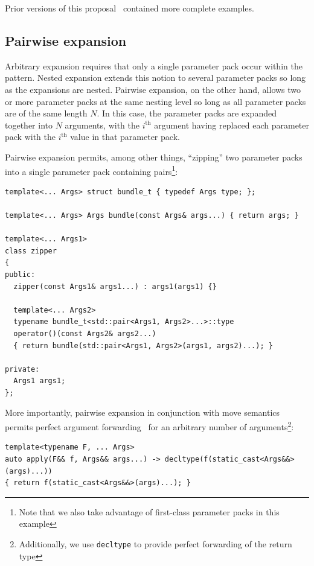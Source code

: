 \documentclass{article}
\begin{document}
Prior versions of this proposal~\cite{GJP04a} contained more complete
examples.

\subsection{Pairwise expansion}
Arbitrary expansion requires that only a single parameter pack occur
within the pattern. Nested expansion extends this notion to several
parameter packs so long as the expansions are nested. Pairwise
expansion, on the other hand, allows two or more parameter packs at
the same nesting level so long as all parameter packs are of the same
length $N$. In this case, the parameter packs are expanded together
into $N$ arguments, with the $i^{\text{th}}$ argument having replaced
each parameter pack with the $i^{\text{th}}$ value in that parameter
pack.

Pairwise expansion permits, among other things, ``zipping'' two
parameter packs into a single parameter pack containing
pairs\footnote{Note that we also take advantage of first-class
  parameter packs in this example}:

\begin{verbatim}
template<... Args> struct bundle_t { typedef Args type; };

template<... Args> Args bundle(const Args& args...) { return args; }

template<... Args1>
class zipper
{
public:
  zipper(const Args1& args1...) : args1(args1) {}

  template<... Args2>
  typename bundle_t<std::pair<Args1, Args2>...>::type
  operator()(const Args2& args2...)
  { return bundle(std::pair<Args1, Args2>(args1, args2)...); }

private:
  Args1 args1;
};
\end{verbatim}

More importantly, pairwise expansion in conjunction with move
semantics~\cite{Hinnant02} permits perfect argument
forwarding~\cite{Dimov02} for an arbitrary number of
arguments\footnote{Additionally, we use \texttt{decltype} to provide
  perfect forwarding of the return type}:

\begin{verbatim}
template<typename F, ... Args>
auto apply(F&& f, Args&& args...) -> decltype(f(static_cast<Args&&>(args)...))
{ return f(static_cast<Args&&>(args)...); }
\end{verbatim}


%
%
\end{document}
